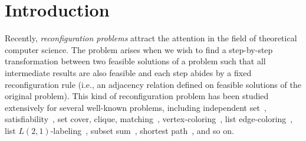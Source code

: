 \documentclass{llncs}
\newcounter{two}
\begin{document}
\section{Introduction}

Recently, {\em reconfiguration problems} attract the attention 
in the field of theoretical computer science. 
The problem arises when we wish to find a step-by-step transformation between 
two feasible solutions of a problem such that 
all intermediate results are also feasible and 
each step abides by a fixed reconfiguration rule 
(i.e., an adjacency relation defined on feasible solutions of the original problem).
This kind of reconfiguration problem has been studied extensively 
for several well-known problems, including 
{\sc independent set}~\cite{BB14,Bon14,BKW14,HearnDemaine2005,HearnDemaine2009,IDHPSUU,ItoKaminskiOnoSuzukiUeharaYamanaka2014,KaminskiMedvedevMilanic2012,MNRSS13,MNRW14,Wro14}, 
{\sc satisfiability}~\cite{Kolaitis,MTY11}, 
{\sc set cover}, {\sc clique}, {\sc matching}~\cite{IDHPSUU}, 
{\sc vertex-coloring}~\cite{BJLPP14,BC09,CHJ11,Wro14},
{\sc list edge-coloring}~\cite{IKD09,IKZ11},
{\sc list $L(2,1)$-labeling}~\cite{IKOZ_isaac},
{\sc subset sum}~\cite{ID11}, 
{\sc shortest path}~\cite{Bon13,KMP11}, and so on.
\end{document}
